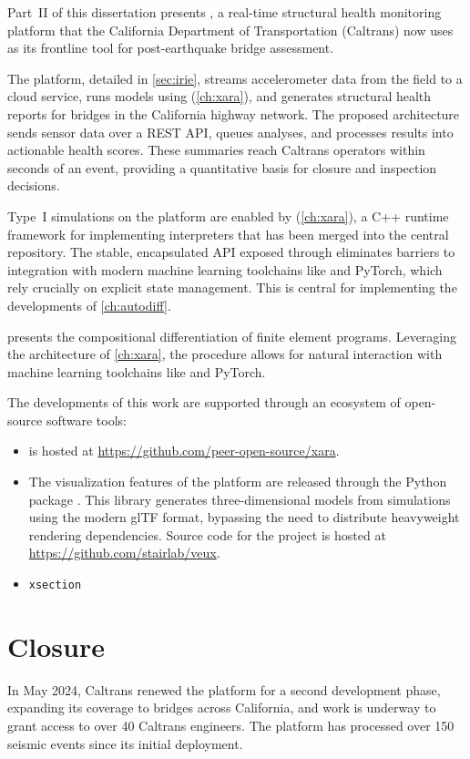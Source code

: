 

Part~II of this dissertation presents \BRACE{}, a real-time structural health monitoring platform that the California Department of Transportation (Caltrans) now uses as its frontline tool for post-earthquake bridge assessment. 

The platform, detailed in \cref{sec:irie}, streams accelerometer data from the field to a cloud service, runs models using \Xara{} (\cref{ch:xara}), and generates structural health reports for bridges in the California highway network. 
The proposed architecture sends sensor data over a REST API, queues analyses, and processes results into actionable health scores. 
These summaries reach Caltrans operators within seconds of an event, providing a quantitative basis for closure and inspection decisions. 


Type~I simulations on the platform are enabled by \Xara{} (\cref{ch:xara}), a C++ runtime framework for implementing interpreters that has been merged into the central \OpenSees{} repository. 
The stable, encapsulated API exposed through \Xara{} eliminates barriers to integration with modern machine learning toolchains like \Jax{} and PyTorch, which rely crucially on explicit state management. 
This is central for implementing the developments of \cref{ch:autodiff}.

 presents the compositional differentiation of finite element programs. Leveraging the architecture of \cref{ch:xara}, the procedure allows for natural interaction with machine learning toolchains like \Jax{} and PyTorch.

The developments of this work are supported through an ecosystem of open-source software tools:
\begin{itemize}
\item \Xara{} is hosted at \href{https://github.com/peer-open-source/xara}{https://github.com/peer-open-source/xara}. 
\item The visualization features of the platform are released through the Python package \Veux{}. 
This library generates three-dimensional models from \OpenSees{} simulations using the modern glTF format, bypassing the need to distribute heavyweight rendering dependencies. 
Source code for the project is hosted at \href{https://github.com/stairlab/veux}{https://github.com/stairlab/veux}.

\item \texttt{xsection}
\end{itemize}


\section{Closure}
In May 2024, Caltrans renewed the \BRACE{} platform for a second development phase, expanding its coverage to bridges across California, and work is underway to grant access to over 40 Caltrans engineers. 
The platform has processed over 150 seismic events since its initial deployment.

